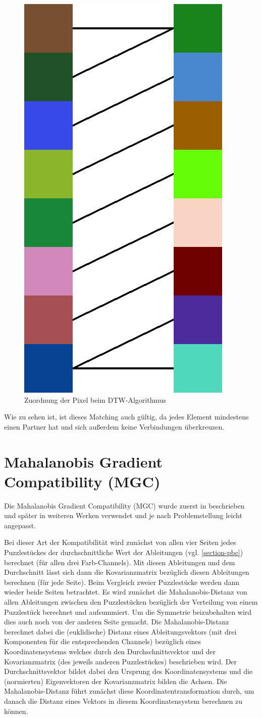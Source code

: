 \documentclass{whswinvcbook}
\begin{document}
\begin{figure}[H]
    \centering
    \includegraphics[width=0.30\linewidth]{img/dtw_ex2.png}
    \caption{Zuordnung der Pixel beim DTW-Algorithmus}
    \label{fig-dtw-ex2}
\end{figure}
Wie zu sehen ist, ist dieses Matching auch gültig, da jedes Element mindestens einen Partner hat und sich außerdem keine Verbindungen überkreuzen.
\section{Mahalanobis Gradient Compatibility (MGC)}\label{section-mgc}
Die Mahalanobis Gradient Compatibility (MGC) wurde zuerst in \cite{gallagher} beschrieben und später in weiteren Werken \cite{linear,paikin,loop,robust,crisjim} verwendet und je nach Problemstellung leicht angepasst.

Bei dieser Art der Kompatibilität wird zunächst von allen vier Seiten jedes Puzzlestückes der durchschnittliche Wert der Ableitungen (vgl. \ref{section-pbc}) berechnet (für allen drei Farb-Channels). Mit diesen Ableitungen und dem Durchschnitt lässt sich dann die Kovarianzmatrix bezüglich diesen Ableitungen berechnen (für jede Seite). Beim Vergleich zweier Puzzlestücke werden dann wieder beide Seiten betrachtet. Es wird zunächst die Mahalanobis-Distanz von allen Ableitungen zwischen den Puzzlestücken bezüglich der Verteilung von einem Puzzlestück berechnet und aufsummiert. Um die Symmetrie beizubehalten wird dies auch noch von der anderen Seite gemacht. Die Mahalanobis-Distanz berechnet dabei die (euklidische) Distanz eines Ableitungsvektors (mit drei Komponenten für die entsprechenden Channels) bezüglich eines Koordinatensystems welches durch den Durchschnittsvektor und der Kovarianzmatrix (des jeweils anderen Puzzlestückes) beschrieben wird. Der Durchschnittsvektor bildet dabei den Ursprung des Koordinatensystems und die (normierten) Eigenvektoren der Kovarianzmatrix bilden die Achsen. Die Mahalanobis-Distanz führt zunächst diese Koordinatentransformation durch, um danach die Distanz eines Vektors in diesem Koordinatensystem berechnen zu können.
\end{document}
